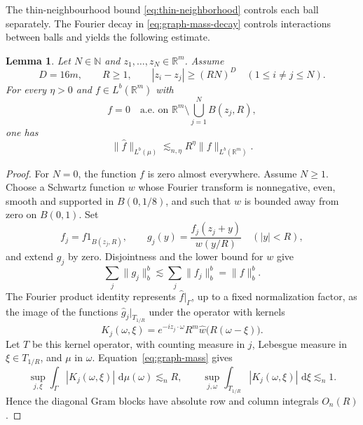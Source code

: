 \documentclass[11pt]{article}
\numberwithin{equation}{section}
\newtheorem{lemma}[theorem]{Lemma}
\newcommand{\R}{\mathbb{R}}
\newcommand{\N}{\mathbb{N}}
\newcommand{\dd}{\,\mathrm{d}}
\newcommand{\norm}[1]{\lVert #1\rVert}
\begin{document}
The thin-neighbourhood bound \eqref{eq:thin-neighborhood}
controls each ball separately. The
Fourier decay in \eqref{eq:graph-mass-decay} controls interactions
between balls and yields the following estimate.

\begin{lemma}\label{lem:graph-sparse}
Let \(N\in\N\) and \(z_1,\ldots,z_N\in\R^m\). Assume
\[
 D=16m,\qquad R\ge1,\qquad
 |z_i-z_j|\ge(RN)^D\quad(1\le i\ne j\le N).
\]
For every \(\eta>0\) and \(f\in L^b(\R^m)\) with
\[
 f=0\quad\text{a.e.\ on }\R^m\setminus\bigcup_{j=1}^N B(z_j,R),
\]
one has
\[
 \norm{\widehat f}_{L^b(\mu)}
 \lesssim_{n,\eta}R^\eta\norm f_{L^b(\R^m)}.
\]
\end{lemma}

\begin{proof}
For \(N=0\), the function \(f\) is zero almost everywhere.
Assume \(N\ge1\). Choose a Schwartz function \(w\) whose Fourier transform is
nonnegative, even, smooth and supported in \(B(0,1/8)\), and
such that \(w\) is bounded away from zero on \(B(0,1)\).
Set
\[
 f_j=f1_{B(z_j,R)},\qquad
 g_j(y)=\frac{f_j(z_j+y)}{w(y/R)}\quad(|y|<R),
\]
and extend \(g_j\) by zero. Disjointness and the lower bound for \(w\) give
\begin{equation}\label{eq:sparse-data-norm}
 \sum_j\norm{g_j}_b^b\lesssim\sum_j\norm{f_j}_b^b=\norm f_b^b.
\end{equation}
The Fourier product identity represents \(\widehat f|_\Gamma\),
up to a fixed normalization factor, as the image of the functions
\(\widehat g_j|_{T_{1/R}}\) under the operator with kernels
\[
 K_j(\omega,\xi)=e^{-iz_j\cdot\omega}R^m
                     \widehat w\bigl(R(\omega-\xi)\bigr).
\]
Let \(T\) be this kernel operator, with counting measure in \(j\),
Lebesgue measure in \(\xi\in T_{1/R}\), and \(\mu\) in \(\omega\).
Equation~\eqref{eq:graph-mass} gives
\begin{equation}\label{eq:sparse-kernel-mass}
 \sup_{j,\xi}\int_\Gamma |K_j(\omega,\xi)|\,\dd\mu(\omega)
 \lesssim_n R,\qquad
 \sup_{j,\omega}\int_{T_{1/R}}|K_j(\omega,\xi)|\,\dd\xi
 \lesssim_n1.
\end{equation}
Hence the diagonal Gram blocks have absolute row and column
integrals \(O_n(R)\).


\end{proof}
\end{document}
